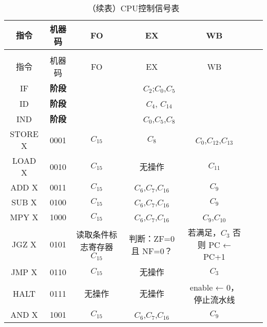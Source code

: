 \documentclass[lang=cn,a4paper,newtx]{elegantpaper}
\begin{document}
\begin{longtable}{ccccccl}
  \caption{CPU控制信号表} \label{tab:five_stage_pipeline_ctrl}\\
  \toprule
  指令 & 机器码 &  FO & EX & WB \\
  \midrule
  \endfirsthead

  \toprule
  \caption[]{（续表）CPU控制信号表} \\
  \toprule
  指令 & 机器码 & FO & EX & WB \\
  \midrule
  \endhead

  \bottomrule
  \endlastfoot
  \rowcolor{red!10}
  IF & \textbf{阶段} & \multicolumn{3}{c}{$C_2$;$C_0$,$C_5$} \\
  \midrule
  \rowcolor{yellow!10}
  ID & \textbf{阶段} & \multicolumn{3}{c}{$C_4$,  $C_{14}$}\\
  \midrule
  \rowcolor{green!10}
  IND & \textbf{阶段} & \multicolumn{3}{c}{$C_0$,$C_5$,$C_8$}\\
  \midrule
  STORE X & 0001 &$C_{15}$  & $C_8$ & $C_0$,$C_{12}$,$C_{13}$ \\

  LOAD X & 0010 &
 $C_{15}$ & 
  无操作 & 
  $C_{11}$ \\
  \midrule
  ADD X & 0011 &
  
 $C_{15}$ &
  $C_6$,$C_7$,$C_{16}$ & 
  $C_9$ \\

  SUB X & 0100 &
  
 $C_{15}$&
  $C_6$,$C_7$,$C_{16}$ & 
  $C_9$ \\
  MPY X & 1000 &
  
 $C_{15}$&
  $C_6$,$C_7$,$C_{16}$ &
  $C_9$,$C_{10}$ \\
  \midrule
  JGZ X & 0101 &
  
  \makecell{读取条件标志寄存器\\$C_{15}$} & 
  判断：ZF=0 且 NF=0？ & 
  \makecell{若满足，$C_3$\\否则 PC ← PC+1} \\

  JMP X & 0110 &
  
  $C_{15}$ &
  无操作 & 
  $C_3$ \\

  HALT & 0111 &
  
  无操作 &
  无操作 & 
  enable ← 0，停止流水线 \\

  
  \midrule
  AND X & 1001 &
  
 $C_{15}$&
  $C_6$,$C_7$,$C_{16}$ &
  $C_9$ \\


\end{longtable}
\end{document}
